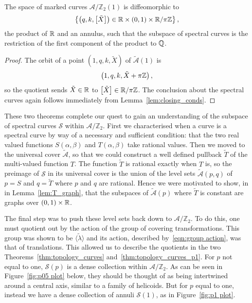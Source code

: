 \documentclass{article}
\begin{document}
\begin{thm}\label{thm:topology_curves_p1}
The space of marked curves $\mathcal{A}/\mathbb{Z}_2(1)$ is diffeomorphic to
\[
\left\{ \left(q,k,\left[\tilde{X}\right]\right) \in \mathbb{R} \times (0,1) \times \mathbb{R}/\pi\mathbb{Z} \right\},
\]
the product of $\mathbb{R}$ and an annulus, such that the subspace of spectral curves is the restriction of the first component of the product to $\mathbb{Q}$.

\begin{proof}
The orbit of a point $(1,q,k,\tilde{X})$ of $\mathcal{\tilde{A}}(1)$ is
\[
\left(1,q,k,\tilde{X}+\pi\mathbb{Z}\right),
\]
so the quotient sends $\tilde{X} \in \mathbb{R}$ to $\left[\tilde{X}\right] \in \mathbb{R}/\pi\mathbb{Z}$. The conclusion about the spectral curves again follows immediately from Lemma~\ref{lem:closing_conds}.
\end{proof}
\end{thm}

These two theorems complete our quest to gain an understanding of the subspace of spectral curves $\mathcal{S}$ within $\mathcal{A}/\mathbb{Z}_2$. First we characterised when a curve is a spectral curve by way of a necessary and sufficient condition: that the two real valued functions $S(\alpha,\beta)$ and $T(\alpha,\beta)$ take rational values.
Then we moved to the universal cover $\mathcal{\tilde{A}}$, so that we could construct a well defined pullback $\tilde{T}$ of the multi-valued function $T$. The function $\tilde{T}$ is rational exactly when $T$ is, so the preimage of $\mathcal{S}$ in its universal cover is the union of the level sets $\mathcal{\tilde{A}}(p,q)$ of $p = S$ and $q = \tilde{T}$ where $p$ and $q$ are rational. Hence we were motivated to show, in in Lemma~\ref{lem:T_graph}, that the subspaces of $\mathcal{\tilde{A}}(p)$ where $\tilde{T}$ is constant are graphs over $(0,1)\times\mathbb{R}$.

The final step was to push these level sets back down to $\mathcal{A}/\mathbb{Z}_2$. To do this, one must quotient out by the action of the group of covering transformations. This group was shown to be $\langle\tilde{\lambda}\rangle$ and its action, described by~\eqref{eqn:group action}, was that of translations. This allowed us to describe the quotients in the two Theorems~\ref{thm:topology_curves} and~\ref{thm:topology_curves_p1}. For $p$ not equal to one, $\mathcal{S}(p)$ is a dense collection within $\mathcal{A}/\mathbb{Z}_2$. As can be seen in Figure~\ref{fig:p05 plot} below, they should be thought of as being intertwined around a central axis, similar to a family of helicoids. But for $p$ equal to one, instead we have a dense collection of annuli $\mathcal{S}(1)$, as in Figure~\ref{fig:p1 plot}.
\end{document}
